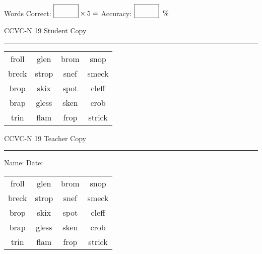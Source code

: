 \documentclass{memoir}
\begin{document}
\small

Words Correct: $\fbox{\phantom{\huge 100}} \times 5 = $ Accuracy: $\fbox{\phantom{\huge 100}}\;\; \%$ 

\vfill

\newpage


\footnotesize \noindent
CCVC-N 19 \hfill Student Copy
\smallskip
\hrule

\Large

\setlength{\tabcolsep}{14pt}
\def\arraystretch{3}

{\selectfont


\begin{vplace}[0.5]
\begin{center}
\begin{tabular}{cccc}
froll & glen & brom          & snop \\
breck       & strop & snef & smeck \\
brop   & skix & spot & cleff            \\
brap               & gless & sken & crob \\
trin & flam             & frop & strick \\
\end{tabular}
\end{center}
\end{vplace}

}

\newpage

\footnotesize \noindent
CCVC-N 19 \hfill Teacher Copy
\smallskip
\hrule

\small

\vfill

\noindent
Name: \underline{\hspace{1.75in}} \hfill Date: \underline{\hspace{1in}}

\Large

{\selectfont


\begin{vplace}[0.5]
\begin{center}
\begin{tabular}{cccc}
froll & glen & brom          & snop \\
breck       & strop & snef & smeck \\
brop   & skix & spot & cleff            \\
brap               & gless & sken & crob \\
trin & flam             & frop & strick \\
\end{tabular}
\end{center}
\end{vplace}



}
\end{document}
